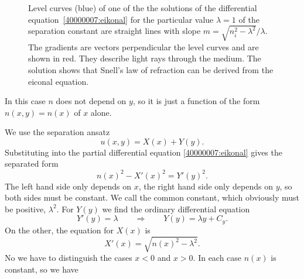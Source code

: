 \begin{loesung}
\begin{figure}
\centering
{}
\caption{Level curves (blue) of one of the the solutions of the
differential equation~\eqref{40000007:eikonal} for the particular
value $\lambda=1$ of the separation constant are straight lines with
slope $m=\sqrt{n_i^2-\lambda^2}/\lambda$.
The gradients are vectors perpendicular the level curves and are
shown in red.
They describe light rays through the medium.
The solution shows that Snell's law of refraction can be derived from
the eiconal equation.
\label{40000007:level}}
\end{figure}
In this case $n$ does not depend on $y$, so it is just a function
of the form $n(x,y)=n(x)$ of $x$ alone.
\begin{teilaufgaben}
\item
We use the separation ansatz
\[
u(x,y)=X(x) + Y(y).
\]
Substituting into the partial differential equation
\eqref{40000007:eikonal} gives the separated form
\[
n(x)^2-X'(x)^2=Y'(y)^2.
\]
The left hand side only depends on $x$, the right hand side only depends
on $y$, so both sides must be constant.
We call the common constant, which obviously must be positive, 
$\lambda^2$.
For 
$Y(y)$
we find the ordinary differential equation
\[
Y'(y)=\lambda \qquad\Rightarrow\qquad Y(y)=\lambda y+ C_y.
\]
On the other, the equation for $X(x)$ is
\[
X'(x)=\sqrt{n(x)^2-\lambda^2}.
\]
No we have to distinguish the cases $x<0$ and $x>0$.
In each case $n(x)$ is constant, so we have

\end{teilaufgaben}
\end{loesung}
